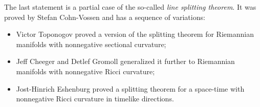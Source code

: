 The last statement is a partial case of the so-called \emph{line splitting theorem}. 
It was proved by Stefan Cohn-Vossen \cite[Satz 5 in][]{convossen} and has a sequence of variations:
\begin{itemize}
 \item Victor Toponogov \cite{toponogov-globalization+splitting} proved a version of the splitting theorem for Riemannian manifolds with nonnegative sectional curvature;
 \item Jeff Cheeger and Detlef Gromoll \cite{cheeger-gromoll-split} generalized it further to Riemannian manifolds with nonnegative Ricci curvature;
 \item Jost-Hinrich Eshenburg \cite{eshenburg-split} proved a splitting theorem for a space-time with nonnegative Ricci curvature in timelike directions.
\end{itemize}
